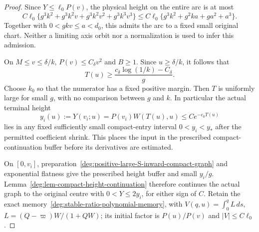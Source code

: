 \begin{proof}
Since \(Y\le\ell_0P(v)\), the physical height on the entire arc is
at most
\[
 C\ell_0\{g^3k^2+g^3k^2v+g^3k^2v^2+g^3k^3v^3\}
 \le C\ell_0\{g^3k^2+g^2ka+ga^2+a^3\}.
\]
Together with \(0<gkv\le a<d_0\), this admits the arc to a
fixed small original chart. Neither a limiting axis orbit nor a
normalization is used to infer this admission.

On \(M\le v\le\delta/k\), \(P(v)\le C_\delta v^2\) and \(B\ge1\).
Since \(u\ge\delta/k\), it follows that
\begin{equation}\label{deg:positive-large-S-inward-action-gap}
 T(u)\ge\frac{c_\delta\log(1/k)-C_\delta}{g}.
\end{equation}
Choose \(k_0\) so that the numerator has a fixed positive margin.
Then \(T\) is uniformly large for small \(g\), with no comparison
between \(g\) and \(k\). In particular the actual terminal height
\begin{equation}\label{deg:positive-large-S-inward-inner-value}
 y_i(u):=Y(v_i;u)=P(v_i)W(T(u),u)
              \le C e^{-c_0T(u)}
\end{equation}
lies in any fixed sufficiently small compact-entry interval
\(0<y_i<y_*\) after the permitted coefficient shrink.
This places the input in the prescribed compact-continuation buffer
before its derivatives are estimated.

On \([0,v_i]\), preparation~\eqref{deg:positive-large-S-inward-compact-graph}
and exponential flatness give the prescribed height buffer and small
\(y_i/g\). Lemma~\ref{deg:lem-compact-height-continuation} therefore
continues the actual graph to the original centre with \(0<Y\le2y_i\),
for either sign of \(C\).
Retain the exact memory~\eqref{deg:stable-ratio-polynomial-memory},
with \(V(q,u)=\int_0^qL\,ds\), \(L=(Q-\varpi)W/(1+QW)\);
its initial factor is \(P(u)/P(v)\) and \(|V|\le C\ell_0\).


\end{proof}
